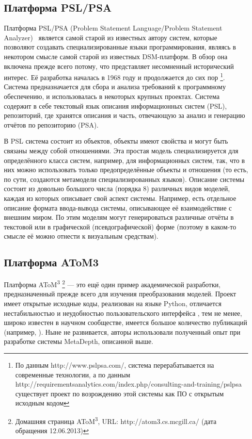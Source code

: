 \subsection{Платформа PSL/PSA}
Платформа PSL/PSA (Problem Statement Language/Problem Statement Analyzer)~\cite{teichroew1977psl} 
является самой старой из известных автору систем, которые позволяют создавать специализированные языки программирования, являясь в некотором
смысле самой старой из известных DSM-платформ. В обзор она включена прежде всего потому, 
что представляет несомненный исторический интерес. Её разработка началась в 1968 году и продолжается до сих пор%
\footnote{По данным http://www.pslpsa.com/, система перерабатывается на современные технологии,
а по данным http://requirementsanalytics.com/index.php/consulting-and-training/pslpsa 
существует проект по возрождению этой системы как ПО с открытым исходным кодом}. Система 
предназначается для сбора и анализа требований к программному обеспечению, и использовалась в некоторых крупных
проектах. Система содержит в себе текстовый язык описания информационных систем (PSL), репозиторий, 
где хранятся описания и часть, отвечающую за анализ и генерацию отчётов по репозиторию (PSA).

В PSL система состоит из объектов, объекты имеют свойства и могут быть связаны между 
собой отношениями. Эта простая модель специализируется для определённого класса систем, 
например, для информационных систем, так, что в них можно использовать только предопределённые 
объекты и отношения (то есть, по сути, создаются метамодели специализированных языков). 
Описание системы состоит из довольно большого числа (порядка 8) различных видов моделей, 
каждая из которых описывает свой аспект системы. Например, есть отдельное описание формата ввода-вывода 
системы, описывающее её взаимодействие с внешним миром. По этим моделям могут генерироваться 
различные отчёты в текстовой или в графической (псевдографической) форме (поэтому в каком-то смысле
её можно отнести к визуальным средствам).

\subsection{Платформа AToM3}
Платформа AToM\textsuperscript{3}%
\footnote{Домашняя страница AToM\textsuperscript{3}, URL: http://atom3.cs.mcgill.ca/ (дата обращения 12.06.2013)}
--- это ещё один пример академической разработки, предназначенный прежде всего для изучения преобразования моделей. Проект имеет открытые 
исходные коды, реализован на языке Python, отличается нестабильностью и неудобностью пользовательского интерфейса%
, тем не менее, широко известен в научном сообществе, имеется большое количество публикаций (например, \cite{vangheluwe2004domain}).
Ныне не развивается, авторы использовали полученный опыт при разработке системы MetaDepth, описанной выше.

